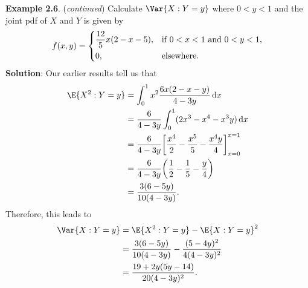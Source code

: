 \begin{Example}
    \textbf{Example 2.6}. (\emph{continued}) Calculate $ \Var{X\given Y=y} $ where $ 0<y<1 $ and the joint pdf of
    $ X $ and $ Y $ is given by
    \[ f(x,y)=\begin{dcases}
            \frac{12}{5}x(2-x-5), & \text{if $ 0<x<1 $ and $ 0<y<1 $,} \\
            0,                    & \text{elsewhere}.
        \end{dcases} \]
    \tcblower{}
    \textbf{Solution}: Our earlier results tell us that
    \begin{align*}
        \E{X^2\given Y=y}
         & =\int_{0}^{1}x^2 \frac{6x(2-x-y)}{4-3y} \odif{x}                                         \\
         & =\frac{6}{4-3y} \int_{0}^{1}(2x^3-x^4-x^3y)\odif{x}                                      \\
         & =\frac{6}{4-3y} \biggl[\frac{x^4}{2} -\frac{x^5}{5} -\frac{x^4 y}{4} \biggr]_{x=0}^{x=1} \\
         & =\frac{6}{4-3y} \biggl(\frac{1}{2} -\frac{1}{5} -\frac{y}{4} \biggr)                     \\
         & =\frac{3(6-5y)}{10(4-3y)}.
    \end{align*}
    Therefore, this leads to
    \begin{align*}
        \Var{X\given Y=y}
         & =\E{X^2\given Y=y}-\E{X\given Y=y}^2                  \\
         & =\frac{3(6-5y)}{10(4-3y)} -\frac{(5-4y)^2}{4(4-3y)^2} \\
         & =\frac{19+2y(5y-14)}{20(4-3y)^2}.
    \end{align*}
\end{Example}
